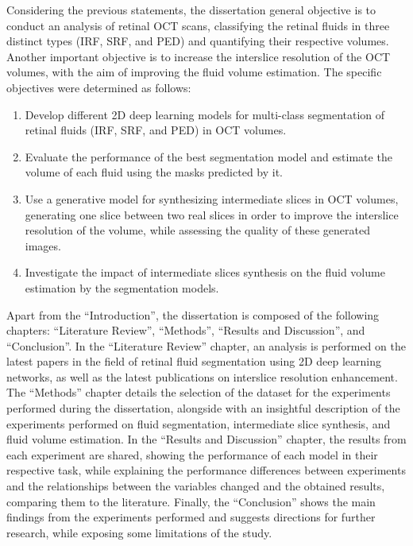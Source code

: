 \par
Considering the previous statements, the dissertation general objective is to conduct an analysis of retinal OCT scans, classifying the retinal fluids in three distinct types (IRF, SRF, and PED) and quantifying their respective volumes. Another important objective is to increase the interslice resolution of the OCT volumes, with the aim of improving the fluid volume estimation. The specific objectives were determined as follows:  
\begin{enumerate}
	\item Develop different 2D deep learning models for multi-class segmentation of retinal fluids (IRF, SRF, and PED) in OCT volumes.
	\item Evaluate the performance of the best segmentation model and estimate the volume of each fluid using the masks predicted by it.
	\item Use a generative model for synthesizing intermediate slices in OCT volumes, generating one slice between two real slices in order to improve the interslice resolution of the volume, while assessing the quality of these generated images.
	\item Investigate the impact of intermediate slices synthesis on the fluid volume estimation by the segmentation models. 
\end{enumerate}
\par
Apart from the ``Introduction'', the dissertation is composed of the following chapters: ``Literature Review'', ``Methods'', ``Results and Discussion'', and ``Conclusion''. In the ``Literature Review'' chapter, an analysis is performed on the latest papers in the field of retinal fluid segmentation using 2D deep learning networks, as well as the latest publications on interslice resolution enhancement. The ``Methods'' chapter details the selection of the dataset for the experiments performed during the dissertation, alongside with an insightful description of the experiments performed on fluid segmentation, intermediate slice synthesis, and fluid volume estimation. In the ``Results and Discussion'' chapter, the results from each experiment are shared, showing the performance of each model in their respective task, while explaining the performance differences between experiments and the relationships between the variables changed and the obtained results, comparing them to the literature. Finally, the ``Conclusion'' shows the main findings from the experiments performed and suggests directions for further research, while exposing some limitations of the study.
